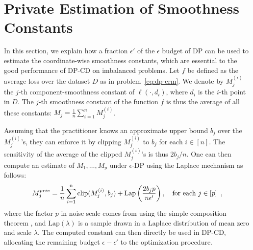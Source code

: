 
\section{Private Estimation of Smoothness Constants}
\label{sec:priv-estim-smoothn}


In this section, we explain how a fraction $\epsilon'$ of the $\epsilon$ budget
of DP
can be used to estimate the coordinate-wise smoothness constants,
which are essential to the good performance of DP-CD on imbalanced problems.
Let
$f$ be
defined as the average loss over the dataset $D$ as in
problem~\eqref{eq:dp-erm}. We
denote
by $M_j^{(i)}$ the $j$-th component-smoothness constant of
$\ell(\cdot, d_i)$, where $d_i$ is the $i$-th point in
$D$. The $j$-th smoothness constant of the function $f$ is thus the
average of all these constants:
$M_j = \frac{1}{n} \sum_{i=1}^n M_j^{(i)}$.

Assuming that the practitioner knows an approximate upper bound $b_j$
over the $M_j^{(i)}$'s, they can enforce it by clipping $M_j^{(i)}$ to
$b_j$ for each $i\in[n]$. The sensitivity of the average of the clipped $M_j^{
(i)}$'s is
thus $2b_j/n$. One can then compute an estimate of $M_1,\dots,M_p$ under $\epsilon$-DP using the Laplace mechanism as follows:
\begin{align}
  M_j^{priv} = \frac{1}{n} \sum_{i=1}^n \operatorname{clip}(M_j^{(i)}, b_j) + \text{Lap}\left
  (\frac{2b_jp}{n\epsilon'}\right),\quad\text{for each }j\in[p]\enspace,
\end{align}
where the factor $p$ in noise scale comes from using the simple
composition theorem \cite{dwork2013Algorithmic}, and
$\text{Lap}(\lambda)$ is a sample drawn in a Laplace distribution of
mean zero and scale $\lambda$.  The computed constant can then
directly be used in DP-CD, allocating the remaining budget
$\epsilon-\epsilon'$ to the optimization procedure.


